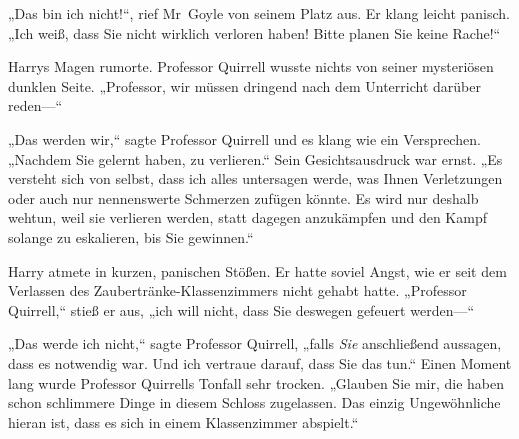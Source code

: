 „Das bin ich nicht!“, rief Mr~Goyle von seinem Platz aus. Er klang leicht panisch. „Ich weiß, dass Sie nicht wirklich verloren haben! Bitte planen Sie keine Rache!“

Harrys Magen rumorte. Professor Quirrell wusste nichts von seiner mysteriösen dunklen Seite. „Professor, wir müssen dringend nach dem Unterricht darüber reden—“

„Das werden wir,“ sagte Professor Quirrell und es klang wie ein Versprechen. „Nachdem Sie gelernt haben, zu verlieren.“ Sein Gesichtsausdruck war ernst. „Es versteht sich von selbst, dass ich alles untersagen werde, was Ihnen Verletzungen oder auch nur nennenswerte Schmerzen zufügen könnte. Es wird nur deshalb wehtun, weil sie verlieren werden, statt dagegen anzukämpfen und den Kampf solange zu eskalieren, bis Sie gewinnen.“

Harry atmete in kurzen, panischen Stößen. Er hatte soviel Angst, wie er seit dem Verlassen des Zaubertränke-Klassenzimmers nicht gehabt hatte. „Professor Quirrell,“ stieß er aus, „ich will nicht, dass Sie deswegen gefeuert werden—“

„Das werde ich nicht,“ sagte Professor Quirrell, „falls \emph{Sie} anschließend aussagen, dass es notwendig war. Und ich vertraue darauf, dass Sie das tun.“ Einen Moment lang wurde Professor Quirrells Tonfall sehr trocken. „Glauben Sie mir, die haben schon schlimmere Dinge in diesem Schloss zugelassen. Das einzig Ungewöhnliche hieran ist, dass es sich in einem Klassenzimmer abspielt.“

